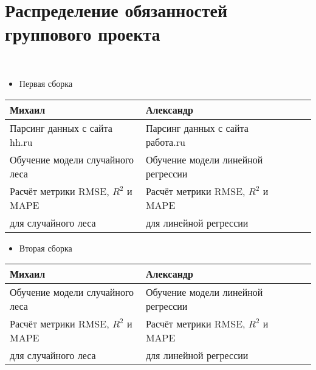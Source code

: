 \documentclass{article}
\begin{document}
\section{Распределение обязанностей группового проекта}
\\
\begin{itemize}
     \color{red} \item \color{black} Первая сборка
\end{itemize}
\begin{center}
\begin{tabular}{ | l | l | l | l | l |}
\hline
Михаил & Александр \\ \hline
Парсинг данных с сайта hh.ru & Парсинг данных с сайта работа.ru\\ \hline
Обучение модели случайного леса  & Обучение модели линейной регрессии\\ \hline
Расчёт метрики RMSE, $R^2$ и MAPE & Расчёт метрики RMSE, $R^2$ и MAPE\\ 
для случайного леса  & для линейной регрессии\\ 
\hline
\end{tabular}
\end{center}

\begin{itemize}
     \color{red} \item \color{black} Вторая сборка
\end{itemize}
\begin{center}
\begin{tabular}{ | l | l | l | l | l |}
\hline
Михаил & Александр \\ \hline
Обучение модели случайного леса  & Обучение модели линейной регрессии\\ \hline
Расчёт метрики RMSE, $R^2$ и MAPE & Расчёт метрики RMSE, $R^2$ и MAPE\\ 
для случайного леса  & для линейной регрессии\\ 
\hline
\end{tabular}
\end{center}
 

\end{document}
